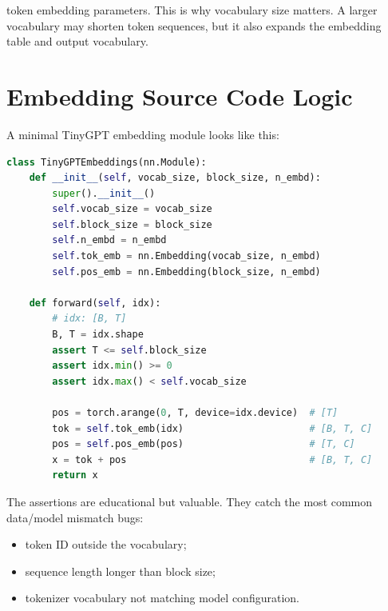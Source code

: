 token embedding parameters. This is why vocabulary size matters. A larger vocabulary may shorten token sequences, but it also expands the embedding table and output vocabulary.

\section{Embedding Source Code Logic}

A minimal TinyGPT embedding module looks like this:

\begin{lstlisting}[language=Python]
class TinyGPTEmbeddings(nn.Module):
    def __init__(self, vocab_size, block_size, n_embd):
        super().__init__()
        self.vocab_size = vocab_size
        self.block_size = block_size
        self.n_embd = n_embd
        self.tok_emb = nn.Embedding(vocab_size, n_embd)
        self.pos_emb = nn.Embedding(block_size, n_embd)

    def forward(self, idx):
        # idx: [B, T]
        B, T = idx.shape
        assert T <= self.block_size
        assert idx.min() >= 0
        assert idx.max() < self.vocab_size

        pos = torch.arange(0, T, device=idx.device)  # [T]
        tok = self.tok_emb(idx)                      # [B, T, C]
        pos = self.pos_emb(pos)                      # [T, C]
        x = tok + pos                                # [B, T, C]
        return x
\end{lstlisting}

The assertions are educational but valuable. They catch the most common data/model mismatch bugs:

\begin{itemize}
  \item token ID outside the vocabulary;
  \item sequence length longer than block size;
  \item tokenizer vocabulary not matching model configuration.
\end{itemize}


